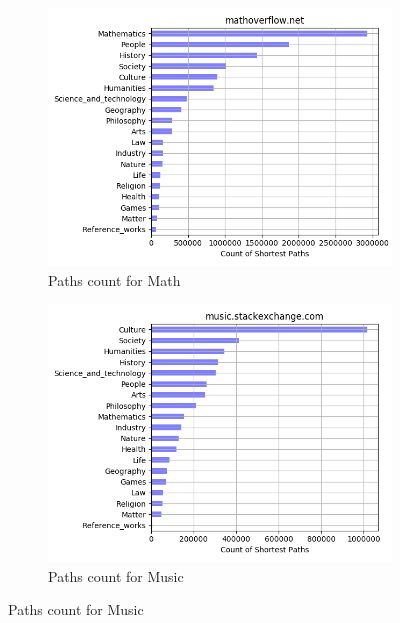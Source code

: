  \begin{figure}[H]
 \ContinuedFloat
    \centering
    \begin{subfigure}{0.5\textwidth}
    \centering
        \includegraphics[width=1\linewidth]{imgs/path-counts/mathoverflow_net}
        \caption{Paths count for Math}
        \label{fig:path-math}
    \end{subfigure}%
    \begin{subfigure}{0.5\textwidth}
    \centering
        \includegraphics[width=1\linewidth]{imgs/path-counts/music_stackexchange_com}
        \caption{Paths count for Music}
        \label{fig:path-music}
    \end{subfigure}
 

\end{figure}
